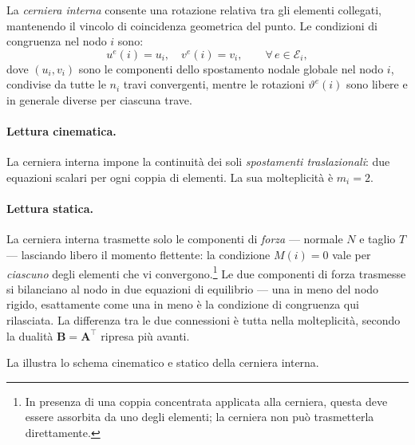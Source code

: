 La \emph{cerniera interna} consente una rotazione relativa
tra gli elementi collegati, mantenendo il vincolo di
coincidenza geometrica del punto. Le condizioni di
congruenza nel nodo $i$ sono:
\begin{equation}\label{eq:cong_cerniera}
	u^e(i) = u_i, \quad
	v^e(i) = v_i, \qquad \forall\, e \in \mathcal{E}_i,
\end{equation}
dove $(u_i, v_i)$ sono le componenti dello spostamento
nodale globale nel nodo $i$, condivise da tutte le $n_i$
travi convergenti, mentre le rotazioni $\vartheta^e(i)$
sono libere e in generale diverse per ciascuna trave.

\paragraph{Lettura cinematica.}
La cerniera interna impone la continuità dei soli
\emph{spostamenti traslazionali}: due equazioni scalari
per ogni coppia di elementi. La sua molteplicità è
$m_i = 2$.

\paragraph{Lettura statica.}
La cerniera interna trasmette solo le componenti
di \emph{forza} --- normale $N$ e taglio $T$ ---
lasciando libero il momento flettente: la condizione
$M(i) = 0$ vale per \emph{ciascuno} degli elementi
che vi convergono.\footnote{%
	In presenza di una coppia concentrata applicata alla
	cerniera, questa deve essere assorbita da uno degli
	elementi; la cerniera non può trasmetterla direttamente.}
Le due componenti di forza trasmesse si bilanciano al nodo in due
equazioni di equilibrio --- una in meno del nodo rigido, esattamente
come una in meno è la condizione di congruenza qui rilasciata. La
differenza tra le due connessioni è tutta nella molteplicità, secondo
la dualità $\bm{B}=\bm{A}^{\top}$ ripresa più avanti.


La  illustra
lo schema cinematico e statico della cerniera interna.







